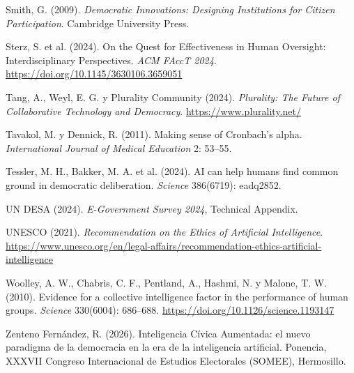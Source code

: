 \documentclass[11pt,a4paper]{article}
\begin{document}
Smith, G. (2009). \emph{Democratic Innovations: Designing Institutions for Citizen Participation}. Cambridge University Press.

Sterz, S. et al. (2024). On the Quest for Effectiveness in Human Oversight: Interdisciplinary Perspectives. \emph{ACM FAccT 2024}. \url{https://doi.org/10.1145/3630106.3659051}

Tang, A., Weyl, E. G. y Plurality Community (2024). \emph{Plurality: The Future of Collaborative Technology and Democracy}. \url{https://www.plurality.net/}

Tavakol, M. y Dennick, R. (2011). Making sense of Cronbach's alpha. \emph{International Journal of Medical Education} 2: 53--55.

Tessler, M. H., Bakker, M. A. et al. (2024). AI can help humans find common ground in democratic deliberation. \emph{Science} 386(6719): eadq2852.

UN DESA (2024). \emph{E-Government Survey 2024}, Technical Appendix.

UNESCO (2021). \emph{Recommendation on the Ethics of Artificial Intelligence}. \url{https://www.unesco.org/en/legal-affairs/recommendation-ethics-artificial-intelligence}

Woolley, A. W., Chabris, C. F., Pentland, A., Hashmi, N. y Malone, T. W. (2010). Evidence for a collective intelligence factor in the performance of human groups. \emph{Science} 330(6004): 686--688. \url{https://doi.org/10.1126/science.1193147}

Zenteno Fernández, R. (2026). Inteligencia Cívica Aumentada: el nuevo paradigma de la democracia en la era de la inteligencia artificial. Ponencia, XXXVII Congreso Internacional de Estudios Electorales (SOMEE), Hermosillo.

\endgroup
\end{document}
